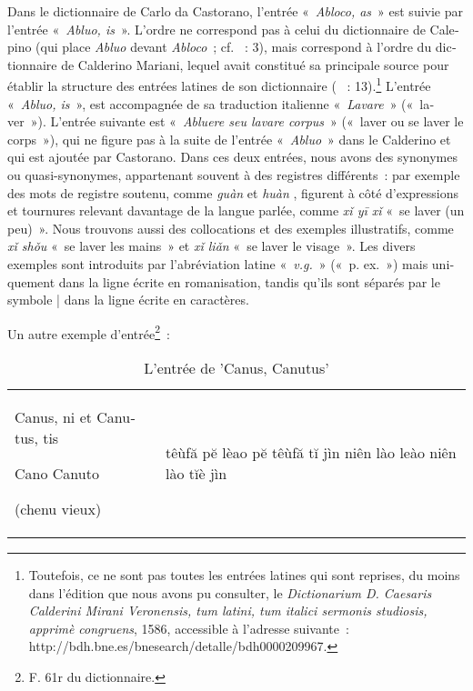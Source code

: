 \documentclass[output=paper,colorlinks,citecolor=brown,arabicfont,chinesefont,booklanguage=french]{langscibook}
\begin{document}
\begin{otherlanguage}{french}
Dans le dictionnaire de Carlo da Castorano, l’entrée «~\emph{Abloco, as}~» est suivie par l’entrée «~\emph{Abluo, is}~». L’ordre ne correspond pas à celui du dictionnaire de Calepino (qui place \emph{Abluo} devant \emph{Abloco}~; cf. \citealt{Calepino1513} ~: 3), mais correspond à l’ordre du dictionnaire de Calderino Mariani, lequel avait constitué sa principale source pour établir la structure des entrées latines de son dictionnaire (\citealt{Calderino1586} ~: 13).\footnote{Toutefois, ce ne sont pas toutes les entrées latines qui sont reprises, du moins dans l’édition que nous avons pu consulter, le \emph{Dictionarium D. Caesaris Calderini Mirani Veronensis, tum latini, tum italici sermonis studiosis, apprimè congruens}, 1586, accessible à l’adresse suivante~:  http://bdh.bne.es/bnesearch/detalle/bdh0000209967.} L’entrée «~\emph{Abluo, is}~», est accompagnée de sa traduction italienne «~\emph{Lavare}~» («~laver~»). L’entrée suivante est «~\emph{Abluere seu lavare corpus}~» («~laver ou se laver le corps~»), qui ne figure pas à la suite de l’entrée «~\emph{Abluo}~» dans le Calderino et qui est ajoutée par Castorano. Dans ces deux entrées, nous avons des synonymes ou quasi-synonymes, appartenant souvent à des registres différents~: par exemple des mots de registre soutenu, comme \emph{guàn} {} et \emph{huàn} {}, figurent à côté d’expressions et tournures relevant davantage de la langue parlée, comme \emph{xǐ yī xǐ} {} «~se laver (un peu)~». Nous trouvons aussi des collocations et des exemples illustratifs, comme \emph{xǐ shǒu} {} «~se laver les mains~» et \emph{xǐ liǎn} {} «~se laver le visage~». Les divers exemples sont introduits par l’abréviation latine «~\emph{v.g.}~» («~p. ex.~») mais uniquement dans la ligne écrite en romanisation, tandis qu’ils sont séparés par le symbole | dans la ligne écrite en caractères.

Un autre exemple d’entrée\footnote{F. 61r du dictionnaire.}~: 

\begin{table}
\caption{L'entrée de 'Canus, Canutus'}
\label{tab:gianninoto:2}
\label{tab:gianninoto:frequencies2}
\begin{tabularx}{\linewidth}{ QQ }
\lsptoprule
Canus, ni et Canutus, tis 

Cano Canuto 

\footnotesize (chenu vieux) & {}

{}
 
têùfă pĕ lèao  pĕ têùfă tĭ jìn  niên lào leào niên lào tĭè jìn


\end{tabularx}
\end{table}
\end{otherlanguage}
\end{document}
